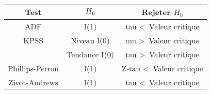  \begin{f}{\ }

\begin{center}
	\begin{tabular}{ c | c | c }
		Test            & $H_{0}$    & Rejeter $H_{0}$                     \\ \hline
		ADF             & I(1)       & tau \textless \, Valeur critique    \\ \hline
		KPSS            & Niveau I(0) & mu \textgreater \, Valeur critique  \\
		& Tendance I(0) & tau \textgreater \, Valeur critique \\ \hline
		Phillips-Perron & I(1)       & Z-tau \textless \, Valeur critique  \\ \hline
		Zivot-Andrews   & I(1)       & tau \textless \, Valeur critique
	\end{tabular}
\end{center}
\medskip

\end{f}  

